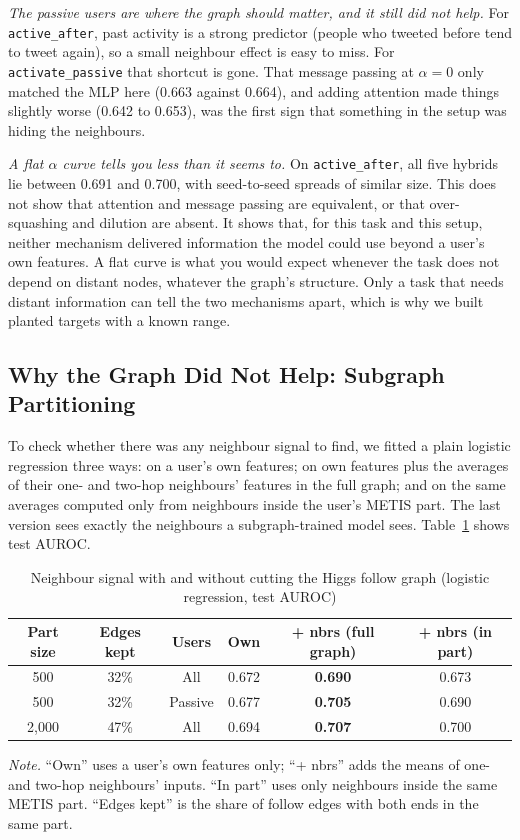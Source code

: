 \emph{The passive users are where the graph should matter, and it still did not help.} For \texttt{active\_\allowbreak after}, past activity is a strong predictor (people who tweeted before tend to tweet again), so a small neighbour effect is easy to miss. For \texttt{activate\_\allowbreak passive} that shortcut is gone. That message passing at $\alpha=0$ only matched the MLP here (0.663 against 0.664), and adding attention made things slightly worse (0.642 to 0.653), was the first sign that something in the setup was hiding the neighbours.

\emph{A flat $\alpha$ curve tells you less than it seems to.} On \texttt{active\_\allowbreak after}, all five hybrids lie between 0.691 and 0.700, with seed-to-seed spreads of similar size. This does not show that attention and message passing are equivalent, or that over-squashing and dilution are absent. It shows that, for this task and this setup, neither mechanism delivered information the model could use beyond a user's own features. A flat curve is what you would expect whenever the task does not depend on distant nodes, whatever the graph's structure. Only a task that needs distant information can tell the two mechanisms apart, which is why we built planted targets with a known range.

\subsection{Why the Graph Did Not Help: Subgraph Partitioning}
To check whether there was any neighbour signal to find, we fitted a plain logistic regression three ways: on a user's own features; on own features plus the averages of their one- and two-hop neighbours' features in the full graph; and on the same averages computed only from neighbours inside the user's METIS part. The last version sees exactly the neighbours a subgraph-trained model sees. Table~\ref{tab:partition} shows test AUROC.

\begin{table}[htbp]
\caption{Neighbour signal with and without cutting the Higgs follow graph (logistic regression, test AUROC)}
\label{tab:partition}
\centering\small
\begin{tabular}{@{}cccccc@{}}
\toprule
Part size & Edges kept & Users & Own & + nbrs (full graph) & + nbrs (in part) \\
\midrule
500 & 32\% & All & 0.672 & \textbf{0.690} & 0.673 \\
500 & 32\% & Passive & 0.677 & \textbf{0.705} & 0.690 \\
2,000 & 47\% & All & 0.694 & \textbf{0.707} & 0.700 \\
\bottomrule
\end{tabular}

\vspace{4pt}
\parbox{0.9\textwidth}{\footnotesize\textit{Note.} ``Own'' uses a user's own features only; ``+ nbrs'' adds the means of one- and two-hop neighbours' inputs. ``In part'' uses only neighbours inside the same METIS part. ``Edges kept'' is the share of follow edges with both ends in the same part.}
\end{table}

